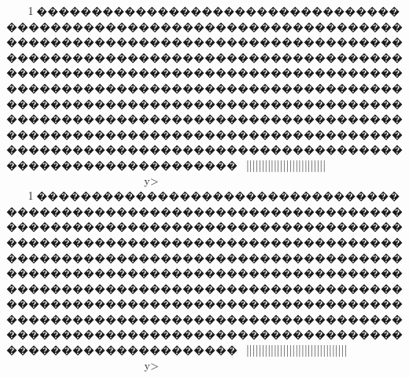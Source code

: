 {{{{{{{{{{{{{{{{{{{{{{{{{{{{{{{{{{{{{{{{{{{{{{{{{{{{{{{{{{{{{{{{{{{{{{{{{{{{{{{{{{{{{{{{{{{{{{{{{{{{{{{{{{{{{{{{{{{{{{{{{{{{{{{{{{{{{{{{{{{{{{{{{{{{{{{{{{{{{{{{{{{{{{{{{{{{{{{{{{{{{{{{{{{{{{{{{{{{{{{{{{{{{{{{{{{{{{{{{{{{{{{{{{{{{{{{{{{{{{{{{{{{{{{{{{{{{{{{{{{{{{{{{{{{{{{{{{{{{{{{{{{{{{{{{{{{{{{{{{{{{{{{{{{{{{{{{{{{{{{{{{{{{{{{{{{{{{{{{{{{{{{{{{{{{{{{{{{{{{{{{{{{{{{{{{{{{{{{{{{{{{{{{{{{{{{{{{{{{{{{{{{{{{{{{{{{{{{{{{{{{{{{{{{{{{{{{{{{{{{{{{{{{{{{{{{{{{{{{{{{{{{{{{{{{{{{{{{{{{{{{{{{{{{{{{{{{{{{{{{{{{{{{{{{{{{{{{{{{{{{{{{{{{{{{{{{{{{{{{{{{{{{{{{{{{{{{{{{{{{{{{{{{{{{{{{{{{{{{{{{{{{{{{{{{{{{{{{{{{{{{{{{{{{{{{{{{{{{{{{{{{{{{{{{{{{{{{{{{{{{{{{{{{{{{{{{{{{{{{{{{{{{{{{{{{{{{{{{{{{{{{{{{{{{{{{{{{{{{{{{{{{{{{{{{{{{{{{{{{{{{{{{{{{{{{{{{{{{{{{{{{{{{{{{{{{{{{{{{{{{{{{{{{{{{{{{{{{{{{{{{{{{{{{{{{{{{{{{{{{{{{{{{{{{{{{{{{{{{{{{{{{{{{{{{{{{{{{{{{{{{{{{{{{{{{{{{{{{{{{{{{{{{{{{{{{{{{{{{{{{{{{{{{{{{{{{{{{{{{{{{{{{{{{{{{{{{{{{{{{{{{{{{{{{{{{{{{{{{{{{{{{{{{{{{{{{{{{{{{{{{{{{{{{{{{{{{{{{{{{{{{{{{{{{{{{{{{{{{{{{{{{{{{{{{{{{{{{{{{{{{{{{{{{{1\ky������������������������������������������������������������������������������������������������������������������������������������������������������������������������������������������������������������������������������������������������������������������������������������������������������������������������������������������������������������������������������������������~}}||}}}}}||||||||{{{{{{{{||||||||}}}}}}}}||||||||}}}}~~~~~~~~~~~~~~~~~~~~y>
1\ky������������������������������������������������������������������������������������������������������������������������������������������������������������������������������������������������������������������������������������������������������������������������������������������������������������������������������������������������������������������������������������������~}}||}}}}}||||||||||||||||}}|||{{{||||||||||||}}}}~~~~~~~~~~~~~~~y>
}}}}}}}}}}}}}}}}}}}}}}}}}}}}}}}}}}}}}}}}}}}}}}}}}}}}}}}}}}}}}}}}}}}}}}}}}}}}}}}}}}}}}}}}}}}}}}}}}}}}}}}}}}}}}}}}}}}}}}}}}}}}}}}}}}}}}}}}}}}}}}}}}}}}}}}}}}}}}}}}}}}}}}}}}}}}}}}}}}}}}}}}}}}}}}}}}}}}}}}}}}}}}}}}}}}}}}}}}}}}}}}}}}}}}}}}}}}}}}}}}}}}}}}}}}}}}}}}}}}}}}}}}}}}}}}}}}}}}}}}}}}}}}}}}}}}}}}}}}}}}}}}}}}}}}}}}}}}}}}}}}}}}}}}}}}}}}}}}}}}}}}}}}}}}}}}}}}}}}}}}}}}}}}}}}}}}}}}}}}}}}}}}}}}}}}}}}}}}}}}}}}}}}}}}}}}}}}}}}}}}}}}}}}}}}}}}}}}}}}}}}}}}}}}}}}}}}}}}}}}}}}}}}}}}}}}}}}}}}}}}}}}}}}}}}}}}}}}}}}}}}}}}}}}}}}}}}}}}}}}}}}}}}}}}}}}}}}}}}}}}}}}}}}}}}}}}}}}}}}}}}}}}}}}}}}}}}}}}}}}}}}}}}}}}}}}}}}}}}}}}}}}}}}}}}}}}}}}}}}}}}}}}}}}}}}}}}}}}}}}}}}}}}}}}}}}}}}}}}}}}}}}}}}}}}}}}}}}}}}}}}}}}}}}}}}}}}}}}}}}}}}}}}}}}}}}}}}}}}}}}}}}}}}}}}}}}}}}}}}}}}}}}}}}}}}}}}}}}}}}}}}}}}}}}}}}}}}}}}}}}}}}}}}}}}}}}}}}}}}}}}}}}}}}}}}}}}}}}}}}}}}}}}}}}}}}}}}}}}}}}}}}}}}}}}}}}}}}}}}}}}}}}}}}}}}}}}}}}}}}}}}}}}}}}}}}}}}}}}}}}}}}}}}}}}}}}}}}}}}}}}}}}}}}}}}}}}}}}}}}}}}}}}}}}}}}}}}}}}}}}}}}}}}}}}}}}}}}}}}}}}}}}}}}}}}}}}}}}}}}}}}}}}}
